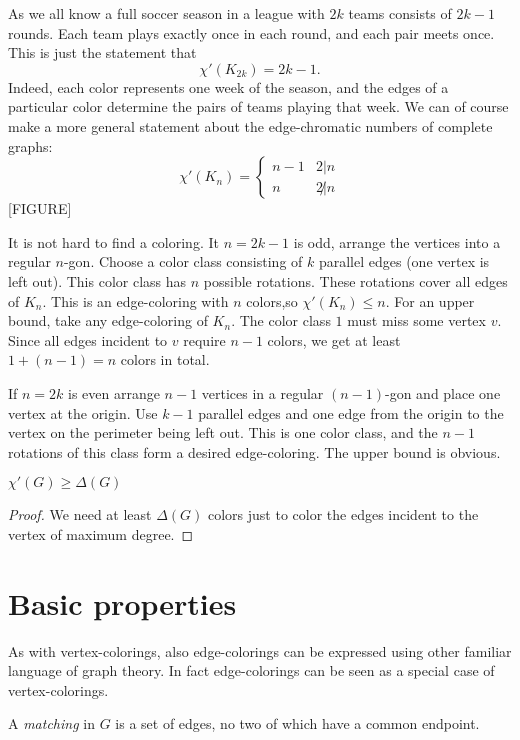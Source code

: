 \begin{example}
As we all know a full soccer season in a league with $2k$ teams consists of $2k-1$ rounds. Each team plays exactly once in each round, and each pair meets once. This is just the statement that
$$\chi'(K_{2k})=2k-1.$$
Indeed, each color represents one week of the season, and the edges of a particular color determine the pairs of teams playing that week. We can of course make a more general statement about the edge-chromatic numbers of complete graphs:
$$\chi'(K_n)=
\begin {cases}
n-1 & 2|n\\
n & 2\not|n
\end {cases}$$
[FIGURE]

It is not hard to find a coloring. It $n=2k-1$ is odd, arrange the vertices into a regular $n$-gon. Choose a color class consisting of $k$ parallel edges (one vertex is left out). This color class has $n$ possible rotations. These rotations cover all edges of $K_n$. This is an edge-coloring with $n$ colors,so $\chi'(K_n) \leq n$. For an upper bound, take any edge-coloring of $K_n$. The color class $1$ must miss some vertex $v$. Since all edges incident to $v$ require $n-1$ colors, we get at least $1+(n-1)=n$ colors in total.

If $n=2k$ is even arrange $n-1$ vertices in a regular $(n-1)$-gon and place one vertex at the origin. Use $k-1$ parallel edges and one edge from the origin to the vertex on the perimeter being left out. This is one color class, and the $n-1$ rotations of this class form a desired edge-coloring. The upper bound is obvious.
\end{example}

\begin{lemma} 
$\chi'(G) \geq \Delta(G)$
\end{lemma}
\begin{proof}
We need at least $\Delta(G)$ colors just to color the edges incident to the vertex of maximum degree.
\end{proof}


\section{Basic properties}

As with vertex-colorings, also edge-colorings can be expressed using other familiar language of graph theory. In fact edge-colorings can be seen as a special case of vertex-colorings.

\begin{definition}
A \emph{matching} in $G$ is a set of edges, no two of which have a common endpoint.
\end{definition} 

